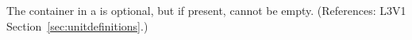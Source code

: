 The  container in a \UnitDefinition is optional, but if present,
cannot be empty.  (References: L3V1 Section~\ref{sec:unitdefinitions}.)
